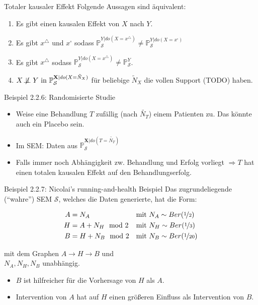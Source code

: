 \begin{frame}{Totaler kausaler Effekt}
    Folgende Aussagen sind äquivalent:

    \begin{enumerate}[label=(\roman*)]
        \item Es gibt einen kausalen Effekt von $X$ nach $Y$.
        \item Es gibt $x^\triangle$ und $x^\square$ sodass $\mathbb{P}_\mathcal{S}^{Y|do(X=x^\triangle)} \neq \mathbb{P}_\mathcal{S}^{Y|do(X=x^\square)}$
        \item Es gibt $x^\triangle$ sodass $\mathbb{P}_\mathcal{S}^{Y|do(X=x^\triangle)} \neq \mathbb{P}_\mathcal{S}^Y$.
        \item $X \not\!\perp\!\!\!\perp Y \text{ in } \mathbb{P}_\mathcal{S}^{\mathbf{X}|do(X=\tilde{N}_X)}$ für beliebige $\tilde{N}_X$ die vollen Support (TODO) haben.
    \end{enumerate}
\end{frame}

\begin{frame}[t]{Beispiel 2.2.6: Randomisierte Studie}
    \begin{itemize}
        \item Weise eine Behandlung $T$ zufällig (nach $\tilde{N_T}$) einem
              Patienten zu. Das könnte auch ein Placebo sein.
        \item Im SEM: Daten aus $\mathbb{P}_\mathcal{S}^{\mathbf{X}|do(T=\tilde{N_T})}$
        \item Falls immer noch Abhängigkeit zw. Behandlung und Erfolg vorliegt
              $\Rightarrow T$ hat einen totalen kausalen Effekt auf den
              Behandlungserfolg.
    \end{itemize}
\end{frame}

\begin{frame}{Beispiel 2.2.7: Nicolai's running-and-health Beispiel}
    Das zugrundeliegende (\enquote{wahre}) SEM $\mathcal{S}$, welches die Daten
    generierte, hat die Form:

    \begin{align}
        A &= N_A            &&\text{mit } N_A \sim Ber(\nicefrac{1}{2})\\
        H &= A + N_H \mod 2 &&\text{mit } N_H \sim Ber(\nicefrac{1}{3})\\
        B &= H + N_B \mod 2 &&\text{mit } N_B \sim Ber(\nicefrac{1}{20})
    \end{align}

    mit dem Graphen $A \rightarrow H \rightarrow B$ und\\
    $N_A, N_H, N_B$ unabhängig.

    \begin{itemize}
        \item<1->  $B$ ist hilfreicher für die Vorhersage von $H$ als $A$.
        \item<2->  Intervention von $A$ hat auf $H$ einen größeren Einfluss als Intervention von $B$.
    \end{itemize}
\end{frame}

